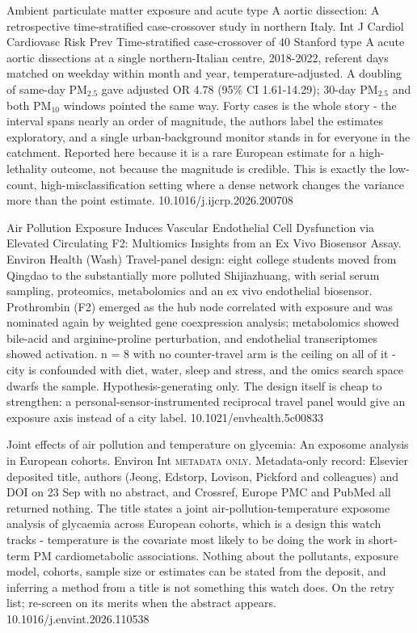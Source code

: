 \documentclass[10pt]{article}
\begin{document}
{Ambient particulate matter exposure and acute type A aortic dissection: A retrospective time-stratified case-crossover study in northern Italy.}
{Int J Cardiol Cardiovasc Risk Prev}
{Time-stratified case-crossover of 40 Stanford type A acute aortic dissections at a single northern-Italian centre, 2018-2022, referent days matched on weekday within month and year, temperature-adjusted. A doubling of same-day PM$_{2.5}$ gave adjusted OR 4.78 (95\% CI 1.61-14.29); 30-day PM$_{2.5}$ and both PM$_{10}$ windows pointed the same way. Forty cases is the whole story - the interval spans nearly an order of magnitude, the authors label the estimates exploratory, and a single urban-background monitor stands in for everyone in the catchment. Reported here because it is a rare European estimate for a high-lethality outcome, not because the magnitude is credible. This is exactly the low-count, high-misclassification setting where a dense network changes the variance more than the point estimate.}
{10.1016/j.ijcrp.2026.200708}

{Air Pollution Exposure Induces Vascular Endothelial Cell Dysfunction via Elevated Circulating F2: Multiomics Insights from an Ex Vivo Biosensor Assay.}
{Environ Health (Wash)}
{Travel-panel design: eight college students moved from Qingdao to the substantially more polluted Shijiazhuang, with serial serum sampling, proteomics, metabolomics and an ex vivo endothelial biosensor. Prothrombin (F2) emerged as the hub node correlated with exposure and was nominated again by weighted gene coexpression analysis; metabolomics showed bile-acid and arginine-proline perturbation, and endothelial transcriptomes showed activation. n = 8 with no counter-travel arm is the ceiling on all of it - city is confounded with diet, water, sleep and stress, and the omics search space dwarfs the sample. Hypothesis-generating only. The design itself is cheap to strengthen: a personal-sensor-instrumented reciprocal travel panel would give an exposure axis instead of a city label.}
{10.1021/envhealth.5c00833}

{Joint effects of air pollution and temperature on glycemia: An exposome analysis in European cohorts.}
{Environ Int}
{\textsc{metadata only.} Metadata-only record: Elsevier deposited title, authors (Jeong, Edstorp, Lovison, Pickford and colleagues) and DOI on 23 Sep with no abstract, and Crossref, Europe PMC and PubMed all returned nothing. The title states a joint air-pollution-temperature exposome analysis of glycaemia across European cohorts, which is a design this watch tracks - temperature is the covariate most likely to be doing the work in short-term PM cardiometabolic associations. Nothing about the pollutants, exposure model, cohorts, sample size or estimates can be stated from the deposit, and inferring a method from a title is not something this watch does. On the retry list; re-screen on its merits when the abstract appears.}
{10.1016/j.envint.2026.110538}
\end{document}
